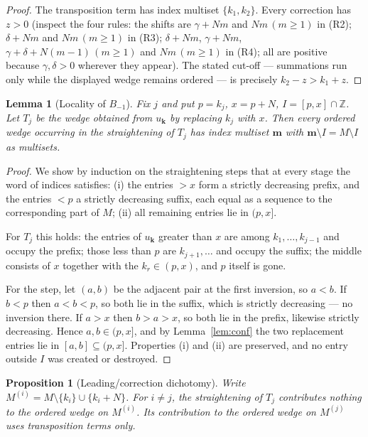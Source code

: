 \documentclass[11pt]{article}
\newtheorem{proposition}[theorem]{Proposition}
\newtheorem{lemma}[theorem]{Lemma}
\theoremstyle{definition}
\theoremstyle{remark}
\newcommand{\Z}{\mathbb{Z}}
\newcommand{\bk}{\mathbf{k}}
\begin{document}
\begin{proof}
The transposition term has index multiset $\{k_1,k_2\}$. Every correction has $z>0$
(inspect the four rules: the shifts are $\gamma+Nm$ and $Nm\,(m\ge1)$ in (R2);
$\delta+Nm$ and $Nm\,(m\ge1)$ in (R3); $\delta+Nm$, $\gamma+Nm$,
$\gamma+\delta+N(m-1)\,(m\ge1)$ and $Nm\,(m\ge1)$ in (R4); all are positive because
$\gamma,\delta>0$ wherever they appear). The stated cut-off --- summations run only while
the displayed wedge remains ordered --- is precisely $k_2-z>k_1+z$.
\end{proof}

\begin{lemma}[Locality of $B_{-1}$]\label{lem:local}
Fix $j$ and put $p=k_j$, $x=p+N$, $I=[p,x]\cap\Z$. Let $T_j$ be the wedge obtained from
$u_{\bk}$ by replacing $k_j$ with $x$. Then every ordered wedge occurring in the
straightening of $T_j$ has index multiset $\mathbf m$ with
$\mathbf m\setminus I=M\setminus I$ as multisets.
\end{lemma}

\begin{proof}
We show by induction on the straightening steps that at every stage the word of indices
satisfies: (i) the entries $>x$ form a strictly decreasing prefix, and the entries $<p$ a
strictly decreasing suffix, each equal as a sequence to the corresponding part of $M$;
(ii) all remaining entries lie in $(p,x]$.

For $T_j$ this holds: the entries of $u_{\bk}$ greater than $x$ are among
$k_1,\dots,k_{j-1}$ and occupy the prefix; those less than $p$ are $k_{j+1},\dots$ and
occupy the suffix; the middle consists of $x$ together with the $k_r\in(p,x)$, and $p$
itself is gone.

For the step, let $(a,b)$ be the adjacent pair at the first inversion, so $a<b$. If
$b<p$ then $a<b<p$, so both lie in the suffix, which is strictly decreasing --- no
inversion there. If $a>x$ then $b>a>x$, so both lie in the prefix, likewise strictly
decreasing. Hence $a,b\in(p,x]$, and by Lemma~\ref{lem:conf} the two replacement entries
lie in $[a,b]\subseteq(p,x]$. Properties (i) and (ii) are preserved, and no entry outside
$I$ was created or destroyed.
\end{proof}

\begin{proposition}[Leading/correction dichotomy]\label{prop:dich}
Write $M^{(i)}=M\setminus\{k_i\}\cup\{k_i+N\}$. For $i\neq j$, the straightening of $T_j$
contributes nothing to the ordered wedge on $M^{(i)}$. Its contribution to the ordered
wedge on $M^{(j)}$ uses transposition terms only.
\end{proposition}
\end{document}
